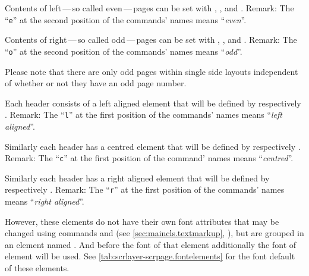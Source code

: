 Contents of left\,---\,so called even\,---\,pages can be set with
, , and . Remark: The ``\texttt{e}''
at the second position of the commands' names means ``\emph{even}''.

Contents of right\,---\,so called odd\,---\,pages can be set with
, , and . Remark: The ``\texttt{o}''
at the second position of the commands' names means ``\emph{odd}''.

Please note that there are only odd pages within single
side layouts independent of whether or not they have an odd page number.

Each header consists of a left aligned element that will be defined by
 respectively . Remark: The ``\texttt{l}'' at the
first position of the commands' names means ``\emph{left aligned}''.

Similarly each header has a centred element that will be defined by
 respectively . Remark: The ``\texttt{c}'' at the
first position of the command' names means ``\emph{centred}''.

Similarly each header has a right aligned element that will be defined by
 respectively . Remark: The ``\texttt{r}'' at the
first position of the commands' names means ``\emph{right aligned}''.

%
%
However, these elements do not have their own font attributes that may be
changed using commands  and  (see
\autoref{sec:maincls.textmarkup}, ),
but are grouped in an element named . And before the
font of that element additionally the font of element
 will be used. See
\autoref{tab:scrlayer-scrpage.fontelements} for the font default of these
elements.%
%
%

